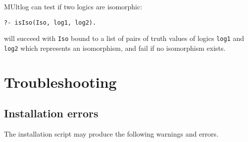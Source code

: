 \documentclass[
]{article}
\newcommand{\passthrough}[1]{#1}
\begin{document}
MUltlog can test if two logics are isomorphic:

\begin{lstlisting}
?- isIso(Iso, log1, log2).
\end{lstlisting}

will succeed with \passthrough{\lstinline!Iso!} bound to a list of pairs
of truth values of logics \passthrough{\lstinline!log1!} and
\passthrough{\lstinline!log2!} which represents an isomorphism, and fail
if no isomorphism exists.

\hypertarget{troubleshooting}{%
\section{Troubleshooting}\label{troubleshooting}}

\hypertarget{installation-errors}{%
\subsection{Installation errors}\label{installation-errors}}

The installation script may produce the following warnings and errors.
\end{document}
